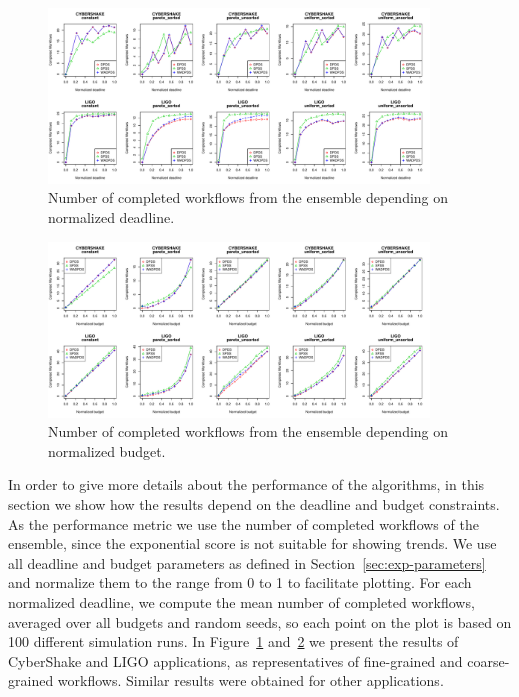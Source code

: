 \documentclass[preprint,5p]{elsarticle}
\begin{document}
\begin{figure}[htb]
    \centering
    \includegraphics[width=0.9\textwidth]{run-finish-variations-test-0-output-deadlines-app-dist-selected}    
    \caption{Number of completed workflows from the ensemble depending on normalized deadline.}
    \label{fig:completed-deadlines}
\end{figure}
\begin{figure}[htb]
    \centering
    \includegraphics[width=0.9\textwidth]{run-finish-variations-test-0-output-budgets-app-dist-selected}    
    \caption{Number of completed workflows from the ensemble depending on normalized budget.}
    \label{fig:completed-budgets}
\end{figure}


In order to give more details about the performance of the algorithms, in this
section we show how the results depend on the deadline and budget constraints.
As the performance metric we use the number of completed workflows of the
ensemble, since the exponential score is not suitable for showing trends.
We use all deadline and budget parameters as defined in
Section~\ref{sec:exp-parameters} and normalize them to the range from 0 to 1 to
facilitate plotting.
For each normalized deadline, we compute the mean number of completed workflows,
averaged over all budgets and random seeds, so each point on the plot is based
on 100 different simulation runs. In Figure~\ref{fig:completed-deadlines}
and~\ref{fig:completed-budgets} we present the results of CyberShake and LIGO
applications, as representatives of fine-grained and coarse-grained workflows.
Similar results were obtained for other applications.
\end{document}
